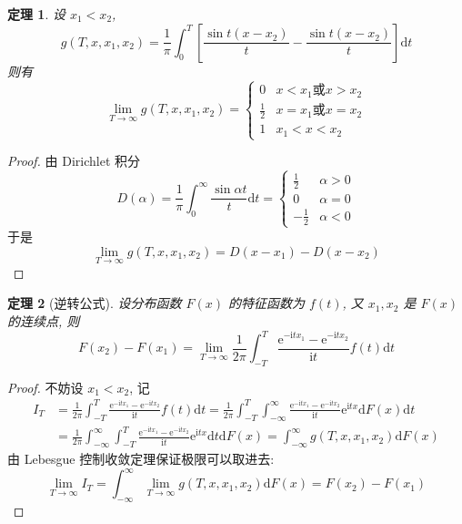 \documentclass[12pt,a4paper]{article}
\newtheorem{thm}{定理}[subsection]  %
\begin{document}
\begin{thm}
    设 $x_1<x_2$, \[g(T, x, x_1, x_2) = \frac{1}{\pi} \int_0^T \left[ \frac{\sin t(x - x_2)}{t} - \frac{\sin t(x - x_2)}{t} \right] \mathrm{d} t\]
    则有 \[ \lim_{T \to \infty} g(T, x, x_1, x_2) = \begin{cases}0 & x<x_1 \text{或} x>x_2  \\ \frac{1}{2}  & x=x_1 \text{或} x = x_2 \\ 1 & x_1<x<x_2 \end{cases}\]
\end{thm}
\begin{proof}
    由 Dirichlet 积分
    \[D(\alpha) = \frac{1}{\pi} \int_{0}^{\infty} \frac{\sin \alpha t}{t} \mathrm{d}t = \begin{cases} \frac{1}{2} & \alpha > 0 \\ 0 & \alpha = 0 \\ - \frac{1}{2} & \alpha<0 \end{cases}\]
    于是 \[\lim_{T \to \infty} g(T, x, x_1, x_2) = D(x-x_1) - D(x-x_2)\]
\end{proof}

\begin{thm}[逆转公式]
    设分布函数 $F(x)$ 的特征函数为 $f(t)$, 又 $x_1, x_2$ 是 $F(x)$ 的连续点, 则 
    \[F(x_2) - F(x_1) = \lim_{T \to \infty} \frac{1}{2\pi} \int_{-T}^{T} \frac{\mathrm{e}^{-\mathrm{i}tx_1} - \mathrm{e}^{-\mathrm{i}tx_2}}{\mathrm{i}t} f(t) \mathrm{d} t\]
\end{thm}
\begin{proof}
    不妨设 $x_1<x_2$, 记 
    \[\begin{aligned}
        I_T & = \frac{1}{2\pi} \int_{-T}^{T} \frac{\mathrm{e}^{-\mathrm{i}tx_1} - \mathrm{e}^{-\mathrm{i}tx_2}}{\mathrm{i}t} f(t) \mathrm{d} t
    = \frac{1}{2\pi} \int_{-T}^{T} \int_{-\infty}^{\infty} \frac{\mathrm{e}^{-\mathrm{i}tx_1} - \mathrm{e}^{-\mathrm{i}tx_2}}{\mathrm{i}t} \mathrm{e}^{\mathrm{i}tx} \mathrm{d} F(x) \mathrm{d}t\\
    & = \frac{1}{2\pi} \int_{-\infty}^{\infty} \int_{-T}^{T} \frac{\mathrm{e}^{-\mathrm{i}tx_1} - \mathrm{e}^{-\mathrm{i}tx_2}}{\mathrm{i}t} \mathrm{e}^{\mathrm{i}tx} \mathrm{d} t \mathrm{d} F(x)
    = \int_{-\infty}^{\infty} g(T, x, x_1, x_2) \mathrm{d} F(x)
    \end{aligned}\]
    由 Lebesgue 控制收敛定理保证极限可以取进去:
    \[\lim_{T \to \infty} I_T = \int_{-\infty}^{\infty} \lim_{T \to \infty} g(T, x, x_1, x_2) \mathrm{d} F(x) = F(x_2) - F(x_1)\]
\end{proof}
\end{document}

